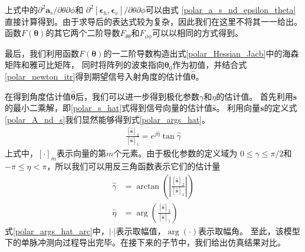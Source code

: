 \documentclass[master]{thesis-uestc}
\begin{document}
上式中的$\partial^2\bm{a}_s/\partial\theta\partial\phi$和
$\partial^2\left[\bm{\epsilon}_h,\bm{\epsilon}_v\right]/\partial\theta\partial\phi$可以由式
\eqref{polar_a_s_nd_epsilon_theta}直接计算得到。由于求导后的表达式较为复杂，因此我们在这里不将其一一给出。
函数$F(\bm{\theta})$的其它两个二阶导数$F_{\theta\theta}$和$F_{\phi\phi}$可以以相同的方式得到。

最后，我们利用函数$F(\bm{\theta})$的一二阶导数构造出式\eqref{polar_Hessian_Jacb}中的海森矩阵和雅可比矩阵，
同时将阵列的波束指向$\bm{\theta}_0$作为初值，并结合式\eqref{polar_newton_itr}得到期望信号入射角度的估计值$\hat{\bm{\theta}}$。

在得到角度估计值$\hat{\bm{\theta}}$后，我们可以进一步得到极化参数$\gamma$和$\eta$的估计值。
首先利用$\bm{s}$的最小二乘解，即\eqref{polar_s_hat}式得到信号向量的估计值$\hat{\bm{s}}$。
利用向量$\bm{s}$的定义式\eqref{polar_A_nd_s}我们显然能够得到式\eqref{polar_args_hat}。
\begin{equation}\label{polar_args_hat}
    \begin{aligned}
        \frac{\left[\hat{\bm{s}}\right]_2}{\left[\hat{\bm{s}}\right]_1} = 
        e^{j\hat{\eta}}\tan\hat{\gamma}
    \end{aligned}
\end{equation}
上式中，$\left[\cdot\right]_m$表示向量的第$m$个元素。由于极化参数的定义域为
$0\le\gamma\le\pi/2$和$-\pi\le\eta<\pi$，所以我们可以用反三角函数表示它们的估计量
\begin{subequations}\label{polar_args_hat_arc}
    \begin{align}
        \hat{\gamma} &= 
        \arctan\left(\left|\frac{\left[\hat{\bm{s}}\right]_2}{\left[\hat{\bm{s}}\right]_1}\right|\right) \\
        \hat{\eta} &= 
        \arg\left(\frac{\left[\hat{\bm{s}}\right]_2}{\left[\hat{\bm{s}}\right]_1}\right)
    \end{align}
\end{subequations}
式\eqref{polar_args_hat_arc}中，$\left|\cdot\right|$表示取幅值，$\arg(\cdot)$表示取幅角。
至此，该模型下的单脉冲测向过程导出完毕。在接下来的子节中，我们给出仿真结果对比。
\end{document}
